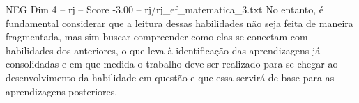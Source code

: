 \begin{textsample}{NEG Dim 4 – rj – Score -3.00 – rj/rj\_ef\_matematica\_3.txt}
No entanto, é fundamental considerar que a leitura dessas habilidades não seja feita de maneira fragmentada, mas sim buscar compreender como elas se conectam com habilidades dos anteriores, o que leva à identificação das aprendizagens já consolidadas e em que medida o trabalho deve ser realizado para se chegar ao desenvolvimento da habilidade em questão e que essa servirá de base para as aprendizagens posteriores.

\end{textsample}
